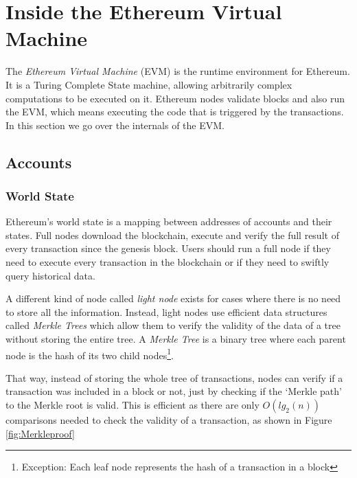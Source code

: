 

\section{Inside the Ethereum Virtual Machine}
The \textit{Ethereum Virtual Machine} (EVM) is the runtime environment for Ethereum. It is a Turing Complete State machine, allowing arbitrarily complex computations to be executed on it. Ethereum nodes validate blocks and also run the EVM, which means executing the code that is triggered by the transactions. In this section we go over the internals of the EVM\@. 

\subsection{Accounts}

\subsubsection*{World State}
Ethereum's world state is a mapping between addresses of accounts and their states. Full nodes download the blockchain, execute and verify the full result of every transaction since the genesis block. Users should run a full node if they need to execute every transaction in the blockchain or if they need to swiftly query historical data. 



A different kind of node called \textit{light node} exists for cases where there is no need to store all the information. Instead, light nodes use efficient data structures called \textit{Merkle Trees} which allow them to verify the validity of the data of a tree without storing the entire tree. A \textit{Merkle Tree} is a binary tree where each parent node is the hash of its two child nodes\footnote{Exception: Each leaf node represents the hash of a transaction in a block}. 



That way, instead of storing the whole tree of transactions, nodes can verify if a transaction was included in a block or not, just by checking if the `Merkle path' to the Merkle root is valid. This is efficient as there are only $O(lg_{2}(n))$ comparisons needed to check the validity of a transaction, as shown in Figure \ref{fig:Merkleproof}

